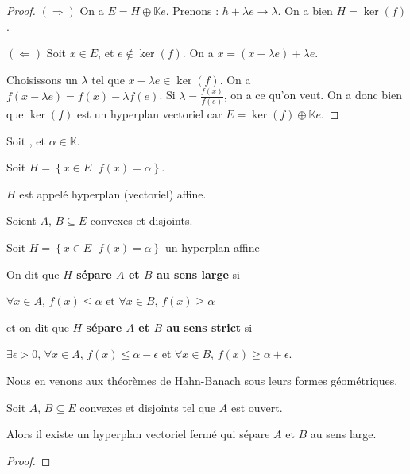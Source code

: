 \begin{proof}
	$(\Rightarrow)$ On a $E = H \oplus \mathbb{K}e$. Prenons
	: $h + \lambda e \rightarrow \lambda$.
	On a bien $H = \ker(f)$.

	$(\Leftarrow)$ Soit $x \in E$, et $e \notin \ker(f)$. On a $x = (x - \lambda
	e) + \lambda e$.
	
	Choisissons un $\lambda$ tel que $x - \lambda e \in
	\ker(f)$. On a $f(x - \lambda e) = f(x) - \lambda f(e)$. Si $\lambda =
	\frac{f(x)}{f(e)}$, on a ce qu'on veut.
	On a donc bien que $\ker(f)$ est un hyperplan vectoriel car $E = \ker(f)
	\oplus \mathbb{K}e$.
\end{proof}

\begin{definition} 
	Soit , et $\alpha \in \mathbb{K}$.
	
	Soit $H = \left\{ x \in E \, | \, f(x) = \alpha \right\}$.

	$H$ est appelé hyperplan (vectoriel) affine.
\end{definition}


\begin{definition}
	Soient $A$, $B \subseteq E$ convexes et disjoints.
	
	Soit $H = \left\{ x \in E \, | \, f(x) = \alpha\right\}$ un hyperplan affine

	On dit que \textbf{$H$ sépare $A$ et $B$ au sens large} si

	$\forall x \in A$, $f(x) \leq \alpha$ et $\forall x \in B$, $f(x) \geq
	\alpha$

	et on dit que \textbf{$H$ sépare $A$ et $B$ au sens strict} si

	$\exists \epsilon > 0$, $\forall x \in A$, $f(x) \leq \alpha -
	\epsilon$ et $\forall x \in B$, $f(x) \geq \alpha + \epsilon$.
\end{definition}

Nous en venons aux théorèmes de Hahn-Banach sous leurs formes géométriques.

\begin{theorem} 
	Soit $A$, $B \subseteq E$ convexes et disjoints tel que $A$ est ouvert.

	Alors il existe un hyperplan vectoriel fermé qui sépare $A$ et $B$ au sens
	large.
\end{theorem}

\begin{proof}
	
\end{proof}

